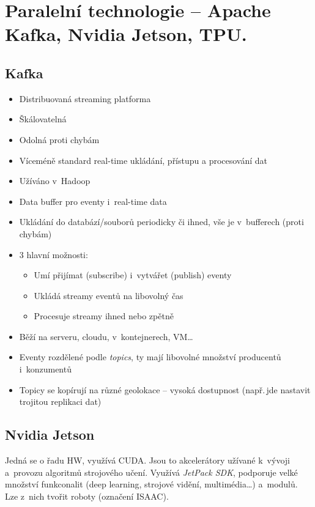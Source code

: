 \section{Paralelní technologie – Apache Kafka, Nvidia Jetson, TPU.}

\subsection{Kafka}
\begin{itemize}
    \item Distribuovaná streaming platforma
    \item Škálovatelná
    \item Odolná proti chybám
    \item Víceméně standard real-time ukládání, přístupu a procesování dat
    \item Užíváno v~Hadoop
    \item Data buffer pro eventy i~real-time data
    \item Ukládání do databází/souborů periodicky či ihned, vše je v~bufferech (proti chybám)
    \item 3 hlavní možnosti:
    \begin{itemize}
        \item Umí přijímat (subscribe) i~vytvářet (publish) eventy
        \item Ukládá streamy eventů na libovolný čas
        \item Procesuje streamy ihned nebo zpětně
    \end{itemize}
    \item Běží na serveru, cloudu, v~kontejnerech, VM\dots
    \item Eventy rozdělené podle \textit{topics}, ty mají libovolné množství producentů i~konzumentů
    \item Topicy se kopírují na různé geolokace -- vysoká dostupnost (např.\,jde nastavit trojitou replikaci dat)
\end{itemize}

\subsection{Nvidia Jetson}
Jedná se o řadu HW, využívá CUDA. Jsou to akcelerátory užívané k~vývoji a~provozu algoritmů strojového učení. Využívá \textit{JetPack SDK}, podporuje velké množství funkconalit (deep learning, strojové vidění, multimédia\dots) a~modulů. Lze z~nich tvořit roboty (označení ISAAC).

